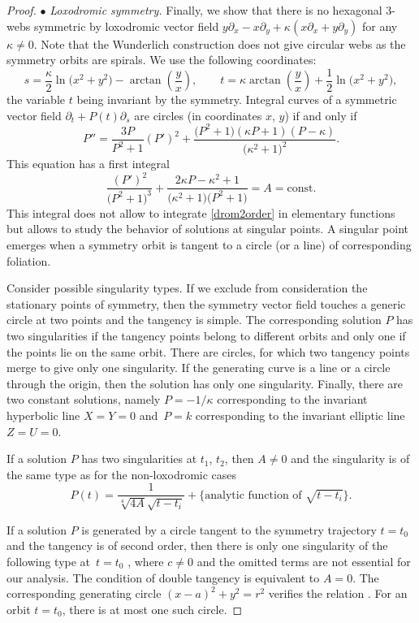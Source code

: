 \documentclass[pdftex]{sigma}
\numberwithin{equation}{section}
\begin{document}
\begin{proof}
$\bullet$ {\it Loxodromic symmetry.}
Finally, we show that there is no hexagonal 3-webs symmetric by loxodromic vector field $y\partial_x-x\partial_y+\kappa (x\partial_x+y\partial_y)$ for any $\kappa\ne 0$. Note that the Wunderlich construction does not give circular webs as the symmetry orbits are spirals. We use the following coordinates:
\[
s= \frac{\kappa}{2} \ln\bigl(x^2 + y^2\bigr)-\arctan\left(\frac{y}{x}\right), \qquad t=\kappa\arctan\left(\frac{y}{x}\right)+ \frac{1}{2} \ln\bigl(x^2 + y^2\bigr),
\]
the variable $t$ being invariant by the symmetry.
Integral curves of a symmetric vector field $\partial_t+P(t)\partial_s$ are circles (in coordinates $x$, $y$)
if and only if
\begin{equation}\label{drom2order}
P''=\frac{3P}{P^2 + 1}(P')^2 + \frac{\bigl(P^2 + 1\bigr)(\kappa P + 1)(P-\kappa)}{\bigl(\kappa^2 + 1\bigr)^2}.
\end{equation}
This equation has a first integral
\[
\frac{(P')^2}{\bigl(P^2 + 1\bigr)^3} + \frac{2\kappa P -\kappa^2+1}{\bigl(\kappa ^2+1\bigr)\bigl(P^2 + 1\bigr)} =A=\text{const}.
\]
This integral does not allow to integrate \eqref{drom2order} in elementary functions but allows to study the behavior of solutions at singular points. A singular point emerges when a symmetry orbit is tangent to a circle (or a line) of corresponding foliation.

Consider possible singularity types. If we exclude from consideration the stationary points of symmetry, then the symmetry vector field touches a generic circle at two points and the tangency is simple. The corresponding solution $P$ has two singularities if the tangency points belong to different orbits and only one if the points lie on the same orbit. There are circles, for which two tangency points merge to give only one singularity. If the generating curve is a line or a circle through the origin, then the solution has only one singularity. Finally, there are two constant solutions, namely $P=-1/\kappa$ corresponding to the invariant hyperbolic line $X=Y=0$ and~${P=k}$ corresponding to the invariant elliptic line $Z=U=0$.

If a solution $P$ has two singularities at $t_1$, $t_2$, then $A\ne 0$ and the singularity is of the same type as for the non-loxodromic cases
\[
P(t)=\frac{1}{\sqrt[4]{4A}\sqrt{t-t_i}}+\bigl\{\text{analytic function of } \sqrt{t-t_i}\bigr\}.
\]

If a solution $P$ is generated by a circle tangent to the symmetry trajectory $t=t_0$ and the tangency is of second order, then there is only one singularity of the following type at~$t=t_0$ ,
where $c\ne 0$ and the omitted terms are not essential for our analysis.
The condition of double tangency is equivalent to $A=0$. The corresponding generating circle $(x-a)^2+y^2=r^2$ verifies the relation . For an orbit $t=t_0$, there is at most one such circle.



\end{proof}
\end{document}
